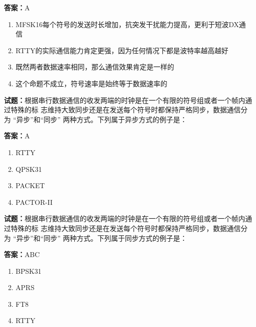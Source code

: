 \documentclass{ctexbook}
\begin{document}
\textbf{答案：}A 

\begin{enumerate}[leftmargin=3em]
  \item MFSK16每个符号的发送时长增加，抗突发干扰能力提高，更利于短波DX通信 

  \item RTTY的实际通信能力肯定更强，因为任何情况下都是波特率越高越好 

  \item 既然两者数据速率相同，那么通信效果肯定是一样的 

  \item 这个命题不成立，符号速率是始终等于数据速率的 

\end{enumerate}





\vspace{1em}

\textbf{试题：}根据串行数据通信的收发两端的时钟是在一个有限的符号组或者一个帧内通过特殊的标
志维持大致同步还是在发送每个符号时都保持严格同步，数据通信分为 “异步”和“同步”
两种方式。下列属于异步方式的例子是： 

\textbf{答案：}A 

\begin{enumerate}[leftmargin=3em]
  \item RTTY 

  \item QPSK31 

  \item PACKET 

  \item PACTOR-II 

\end{enumerate}





\vspace{1em}

\textbf{试题：}根据串行数据通信的收发两端的时钟是在一个有限的符号组或者一个帧内通过特殊的标
志维持大致同步还是在发送每个符号时都保持严格同步，数据通信分为 “异步”和“同步”
两种方式。下列属于同步方式的例子是： 

\textbf{答案：}ABC 

\begin{enumerate}[leftmargin=3em]
  \item BPSK31 

  \item APRS 

  \item FT8 

  \item RTTY 

\end{enumerate}
\end{document}
